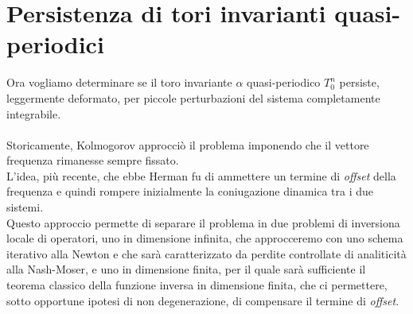 \documentclass[twoside, 11pt]{amsbook}
\newcommand{\0}{{(0)}}
\newcommand{\3}{{(3)}}
\theoremstyle{colonplain}
\theoremstyle{colondefinition}
\theoremstyle{colonremark}
\numberwithin{equation}{chapter}
\begin{document}
\chapter{Persistenza di tori invarianti quasi-periodici}
Ora vogliamo determinare se il toro invariante $\alpha$ quasi-periodico $T^n_0$ persiste, leggermente deformato, per piccole perturbazioni del sistema completamente integrabile. \\ \\
Storicamente, Kolmogorov approcciò il problema imponendo che il vettore frequenza rimanesse sempre fissato. \\
L'idea, più recente, che ebbe Herman fu di ammettere un termine di \textit{offset} della frequenza e quindi rompere inizialmente la coniugazione dinamica tra i due sistemi. \\
Questo approccio permette di separare il problema in due problemi di inversiona locale di operatori, uno in dimensione infinita, che approcceremo con uno schema iterativo alla Newton e che sarà caratterizzato da perdite controllate di analiticità alla Nash-Moser, e uno in dimensione finita, per il quale sarà sufficiente il teorema classico della funzione inversa in dimensione finita, che ci permettere, sotto opportune ipotesi di non degenerazione, di compensare il termine di \textit{offset}.
\end{document}
